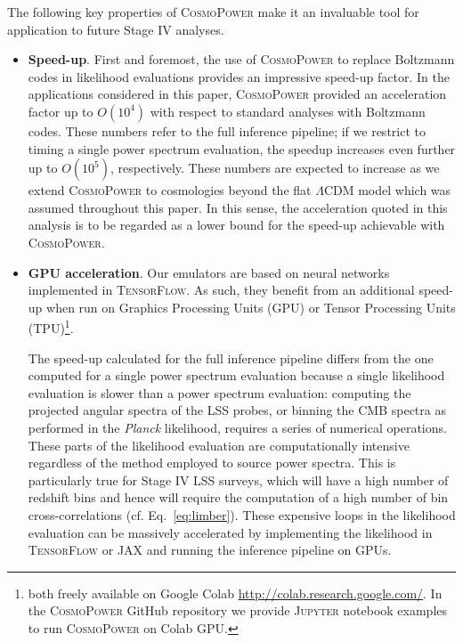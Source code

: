 \documentclass[fleqn,usenatbib]{mnras}
\begin{document}
The following key properties of \textsc{CosmoPower} make it an invaluable tool for application to future Stage IV analyses.

\begin{itemize}

\item \textbf{Speed-up}. First and foremost, the use of \textsc{CosmoPower} to replace Boltzmann codes in likelihood evaluations provides an impressive speed-up factor. In the applications considered in this paper, \textsc{CosmoPower} provided an acceleration factor up to $O(10^4)$ with respect to standard analyses with Boltzmann codes. These numbers refer to the full inference pipeline; if we restrict to timing a single power spectrum evaluation, the speedup increases even further up to $O(10^5)$, respectively. These numbers are expected to increase as we extend \textsc{CosmoPower} to cosmologies beyond the flat $\Lambda$CDM model which was assumed throughout this paper. In this sense, the acceleration quoted in this analysis is to be regarded as a lower bound for the speed-up achievable with \textsc{CosmoPower}.

\smallskip

\item \textbf{GPU acceleration}. Our emulators are based on neural networks implemented in \textsc{TensorFlow}. As such, they benefit from an additional speed-up when run on Graphics Processing Units (GPU) or Tensor Processing Units (TPU)\footnote{both freely available on Google Colab \url{http://colab.research.google.com/}. In the \textsc{CosmoPower} GitHub repository we provide \textsc{Jupyter} notebook examples to run \textsc{CosmoPower} on Colab GPU.}.

The speed-up calculated for the full inference pipeline differs from the one computed for a single power spectrum evaluation because a single likelihood evaluation is slower than a power spectrum evaluation: computing the projected angular spectra of the LSS probes, or binning the CMB spectra as performed in the \textit{Planck} likelihood, requires a series of numerical operations. These parts of the likelihood evaluation are computationally intensive regardless of the method employed to source power spectra. This is particularly true for Stage IV LSS surveys, which will have a high number of redshift bins and hence will require the computation of a high number of bin cross-correlations (cf. Eq.~\ref{eq:limber}). These expensive loops in the likelihood evaluation can be massively accelerated by implementing the likelihood in \textsc{TensorFlow} or \textsc{JAX} \citep{Jax18} and running the inference pipeline on GPUs.


\end{itemize}
\end{document}
